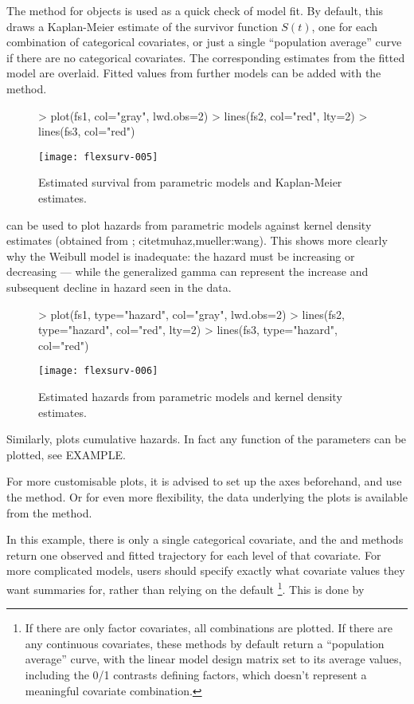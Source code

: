 \documentclass[nojss,nofooter]{jss}
\begin{document}
The  method for  objects is used as a
quick check of model fit.  By default, this draws a Kaplan-Meier
estimate of the survivor function $S(t)$, one for each combination of
categorical covariates, or just a single ``population average'' curve if there are no
categorical covariates.  The corresponding estimates from the fitted
model are overlaid.  Fitted values from further models can be added
with the  method.  
\begin{figure}
  \centering
\begin{Schunk}
\begin{Sinput}
> plot(fs1, col="gray", lwd.obs=2)
> lines(fs2, col="red", lty=2)
> lines(fs3, col="red")
\end{Sinput}
\end{Schunk}
\texttt{[image: flexsurv-005]}
  \caption{Estimated survival from parametric models and Kaplan-Meier estimates.}
  \label{fig:surv}
\end{figure}
 can be used to plot hazards from parametric
models against kernel density estimates (obtained from ;
citet{muhaz,mueller:wang}).  This shows more clearly why the Weibull
model is inadequate: the hazard must be increasing or decreasing ---
while the generalized gamma can represent the increase and subsequent
decline in hazard seen in the data.
\begin{figure}
  \centering
\begin{Schunk}
\begin{Sinput}
> plot(fs1, type="hazard", col="gray", lwd.obs=2)
> lines(fs2, type="hazard", col="red", lty=2)
> lines(fs3, type="hazard", col="red")
\end{Sinput}
\end{Schunk}
\texttt{[image: flexsurv-006]}
  \caption{Estimated hazards from parametric models and kernel density estimates.}
  \label{fig:surv}
\end{figure}

Similarly,  plots cumulative hazards. In fact any
function of the parameters can be plotted, see EXAMPLE.

For more customisable plots, it is advised to set up the axes
beforehand, and use the  method.  Or for even more
flexibility, the data underlying the plots is available from the
 method.

In this example, there is only a single categorical covariate, and the
 and  methods return one observed and fitted
trajectory for each level of that covariate.  For more complicated
models, users should specify exactly what covariate values they
want summaries for, rather than relying on the default \footnote{If there are only factor covariates, all combinations are plotted.  If
there are any continuous covariates, these methods by default return a ``population average''
curve, with the linear model design matrix set to its average
values, including the 0/1 contrasts defining factors, which doesn't
represent a meaningful covariate combination.}.
This is done by
\end{document}
